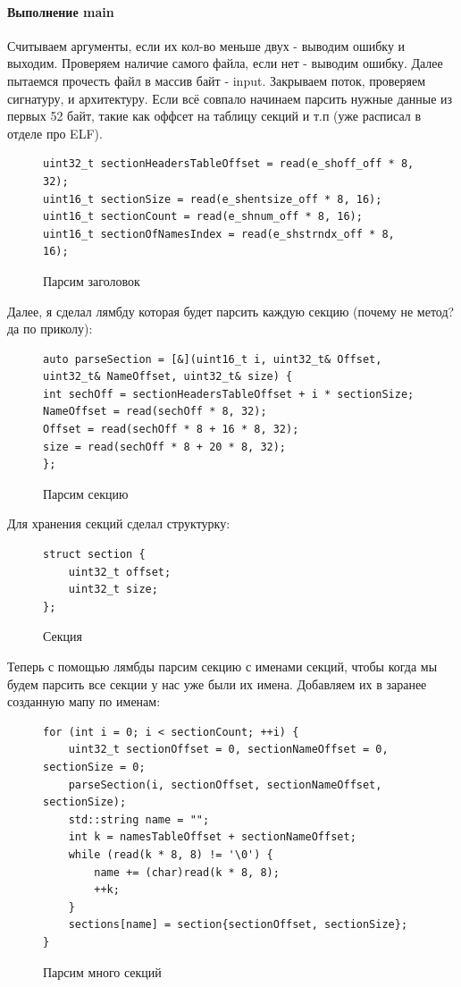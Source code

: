 \documentclass{article}
\begin{document}
\paragraph{Выполнение main}
Считываем аргументы, если их кол-во меньше двух - выводим ошибку и выходим. Проверяем наличие самого файла, если нет - выводим ошибку. Далее пытаемся прочесть файл в массив байт - input. Закрываем поток, проверяем сигнатуру, и архитектуру. Если всё совпало начинаем парсить нужные данные из первых 52 байт, такие как оффсет на таблицу секций и т.п (уже расписал в отделе про ELF).
\begin{figure}[H]
	\begin{lstlisting}
uint32_t sectionHeadersTableOffset = read(e_shoff_off * 8, 32);
uint16_t sectionSize = read(e_shentsize_off * 8, 16);
uint16_t sectionCount = read(e_shnum_off * 8, 16);
uint16_t sectionOfNamesIndex = read(e_shstrndx_off * 8, 16);
	\end{lstlisting}
	\caption{Парсим заголовок}
\end{figure}
Далее, я сделал лямбду которая будет парсить каждую секцию (почему не метод? да по приколу):
\begin{figure}[H]
	\begin{lstlisting}
auto parseSection = [&](uint16_t i, uint32_t& Offset, uint32_t& NameOffset, uint32_t& size) {
int sechOff = sectionHeadersTableOffset + i * sectionSize;
NameOffset = read(sechOff * 8, 32);
Offset = read(sechOff * 8 + 16 * 8, 32);
size = read(sechOff * 8 + 20 * 8, 32);
};
	\end{lstlisting}
	\caption{Парсим секцию}
\end{figure}
Для хранения секций сделал структурку:
\begin{figure}[H]
	\begin{lstlisting}
struct section {
	uint32_t offset;
	uint32_t size;
};
	\end{lstlisting}
	\caption{Секция}
\end{figure}
Теперь с помощью лямбды парсим секцию с именами секций, чтобы когда мы будем парсить все секции у нас уже были их имена. Добавляем их в заранее созданную мапу по именам:
\begin{figure}[H]
	\begin{lstlisting}
for (int i = 0; i < sectionCount; ++i) {
	uint32_t sectionOffset = 0, sectionNameOffset = 0, sectionSize = 0;
	parseSection(i, sectionOffset, sectionNameOffset, sectionSize);
	std::string name = "";
	int k = namesTableOffset + sectionNameOffset;
	while (read(k * 8, 8) != '\0') {
		name += (char)read(k * 8, 8);
		++k;
	}
	sections[name] = section{sectionOffset, sectionSize};
}
	\end{lstlisting}
	\caption{Парсим много секций}
\end{figure}
\end{document}
